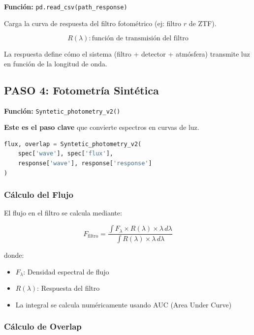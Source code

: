 \documentclass[11pt,a4paper]{article}
\begin{document}
\textbf{Función:} \texttt{pd.read\_csv(path\_response)}

Carga la curva de respuesta del filtro fotométrico (ej: filtro $r$ de ZTF).

\begin{equation}
R(\lambda) : \text{función de transmisión del filtro}
\end{equation}

La respuesta define cómo el sistema (filtro + detector + atmósfera) transmite luz en función de la longitud de onda.

\subsection{PASO 4: Fotometría Sintética }

\textbf{Función:} \texttt{Syntetic\_photometry\_v2()}

\textbf{Este es el paso clave} que convierte espectros en curvas de luz.

\begin{lstlisting}[language=Python, caption=Fotometría sintética]
flux, overlap = Syntetic_photometry_v2(
    spec['wave'], spec['flux'],
    response['wave'], response['response']
)
\end{lstlisting}

\subsubsection{Cálculo del Flujo}

El flujo en el filtro se calcula mediante:

\begin{equation}
F_{\text{filtro}} = \frac{\int F_\lambda \times R(\lambda) \times \lambda \, d\lambda}{\int R(\lambda) \times \lambda \, d\lambda}
\end{equation}

donde:
\begin{itemize}
    \item $F_\lambda$: Densidad espectral de flujo
    \item $R(\lambda)$: Respuesta del filtro
    \item La integral se calcula numéricamente usando AUC (Area Under Curve)
\end{itemize}

\subsubsection{Cálculo de Overlap}
\end{document}

